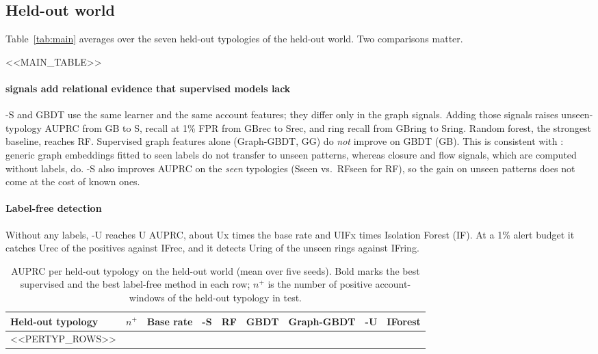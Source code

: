 \subsection{Held-out world}

Table~\ref{tab:main} averages over the seven held-out typologies of the held-out world. Two comparisons matter.

<<MAIN_TABLE>>

\paragraph{\coral{} signals add relational evidence that supervised models lack}
\coral{}-S and GBDT use the same learner and the same account features; they differ only in the \coral{} graph signals. Adding those signals raises unseen-typology AUPRC from {{GB}} to {{S}}, recall at 1\% FPR from {{GBrec}} to {{Srec}}, and ring recall from {{GBring}} to {{Sring}}. Random forest, the strongest baseline, reaches {{RF}}. Supervised graph features alone (Graph-GBDT, {{GG}}) do \emph{not} improve on GBDT ({{GB}}). This is consistent with \citet{maganti2026liability}: generic graph embeddings fitted to seen labels do not transfer to unseen patterns, whereas closure and flow signals, which are computed without labels, do. \coral{}-S also improves AUPRC on the \emph{seen} typologies ({{Sseen}} vs.\ {{RFseen}} for RF), so the gain on unseen patterns does not come at the cost of known ones.

\paragraph{Label-free detection}
Without any labels, \coral{}-U reaches {{U}} AUPRC, about {{Ux}} times the base rate and {{UIFx}} times Isolation Forest ({{IF}}). At a 1\% alert budget it catches {{Urec}} of the positives against {{IFrec}}, and it detects {{Uring}} of the unseen rings against {{IFring}}.

\begin{table}[t]
\centering
\caption{AUPRC per held-out typology on the held-out world (mean over five seeds). Bold marks the best supervised and the best label-free method in each row; $n^+$ is the number of positive account-windows of the held-out typology in test.}
\label{tab:pertyp}
\small\setlength{\tabcolsep}{3pt}
\begin{tabular}{lrccccccc}
\toprule
Held-out typology & $n^+$ & Base rate & \coral{}-S & RF & GBDT & Graph-GBDT & \coral{}-U & IForest \\
\midrule
<<PERTYP_ROWS>>
\bottomrule
\end{tabular}
\end{table}

